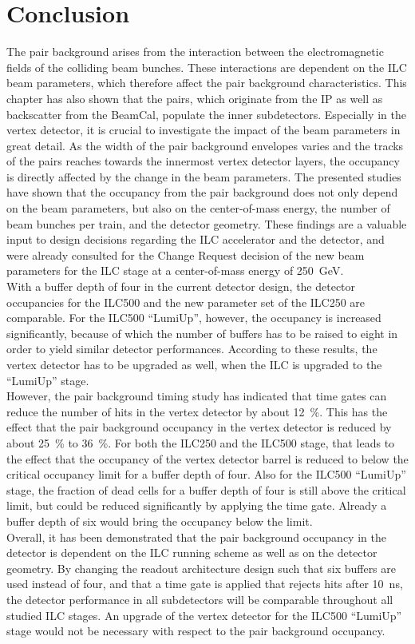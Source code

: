 \section{Conclusion}
The pair background arises from the interaction between the electromagnetic fields of the colliding beam bunches.
These interactions are dependent on the ILC beam parameters, which therefore affect the pair background characteristics.
This chapter has also shown that the pairs, which originate from the IP as well as backscatter from the BeamCal, populate the inner \sid subdetectors.
Especially in the vertex detector, it is crucial to investigate the impact of the beam parameters in great detail.
As the width of the pair background envelopes varies and the tracks of the pairs reaches towards the innermost vertex detector layers, the occupancy is directly affected by the change in the beam parameters.
The presented studies have shown that the occupancy from the pair background does not only depend on the beam parameters, but also on the center-of-mass energy, the number of beam bunches per train, and the \sid detector geometry.
These findings are a valuable input to design decisions regarding the ILC accelerator and the \sid detector, and were already consulted for the Change Request decision of the new beam parameters for the ILC stage at a center-of-mass energy of \SI{250}{\GeV}.
\\With a buffer depth of four in the current \sid detector design, the detector occupancies for the ILC500 and the new parameter set of the ILC250 are comparable.
For the ILC500 ``LumiUp'', however, the occupancy is increased significantly, because of which the number of buffers has to be raised to eight in order to yield similar detector performances.
According to these results, the \sid vertex detector has to be upgraded as well, when the ILC is upgraded to the ``LumiUp'' stage.
\\However, the pair background timing study has indicated that time gates can reduce the number of hits in the vertex detector by about \SI{12}{\percent}.
This has the effect that the pair background occupancy in the vertex detector is reduced by about \SI{25}{\percent} to \SI{36}{\percent}.
For both the ILC250 and the ILC500 stage, that leads to the effect that the occupancy of the \sid vertex detector barrel is reduced to below the critical occupancy limit for a buffer depth of four.
Also for the ILC500 ``LumiUp'' stage, the fraction of dead cells for a buffer depth of four is still above the critical limit, but could be reduced significantly by applying the time gate.
Already a buffer depth of six would bring the occupancy below the limit.
\\Overall, it has been demonstrated that the pair background occupancy in the \sid detector is dependent on the ILC running scheme as well as on the \sid detector geometry.
By changing the \sid readout architecture design such that six buffers are used instead of four, and that a time gate is applied that rejects hits after \SI{10}{\nano\second}, the detector performance in all subdetectors will be comparable throughout all studied ILC stages.
An upgrade of the vertex detector for the ILC500 ``LumiUp'' stage would not be necessary with respect to the pair background occupancy.